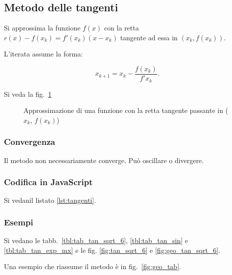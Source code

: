 \subsection{Metodo delle tangenti}

Si approssima la funzione $f(x)$ con la retta $r(x) - f(x_k) = f'(x_k) (x - x_k)$ tangente ad essa in $(x_k, f(x_k))$.

L'iterata assume la forma:

$$x_{k+1} = x_k - \frac{f(x_k)}{f'{x_k}}.$$

Si veda la fig.~\ref{fig:retta_tangente}

\begin{figure}
    \begin{center}
        
        \caption{Approssimazione di una funzione con la retta tangente passante in ($x_k$, $f(x_k)$)}
        \label{fig:retta_tangente}
    \end{center}
\end{figure}


\subsubsection{Convergenza}

Il metodo non necessariamente converge.
Può oscillare o divergere.

\subsubsection{Codifica in JavaScript}


Si vedanil listato \ref{lst:tangenti}.

\begin{lstfloat}
    
    \caption{Descrizione in JavaScript del metodo delle tangenti}
    \label{lst:tangenti}
\end{lstfloat}

\subsubsection{Esempi}

Si vedano le tabb.~\ref{tbl:tab_tan_sqrt_6}, \ref{tbl:tab_tan_sin} e \ref{tbl:tab_tan_exp_mx} e le fig. \ref{fig:tan_sqrt_6} e \ref{fig:geo_tan_sqrt_6}.

Una esempio che riassume il metodo è in fig.~\ref{fig:geo_tab}.

